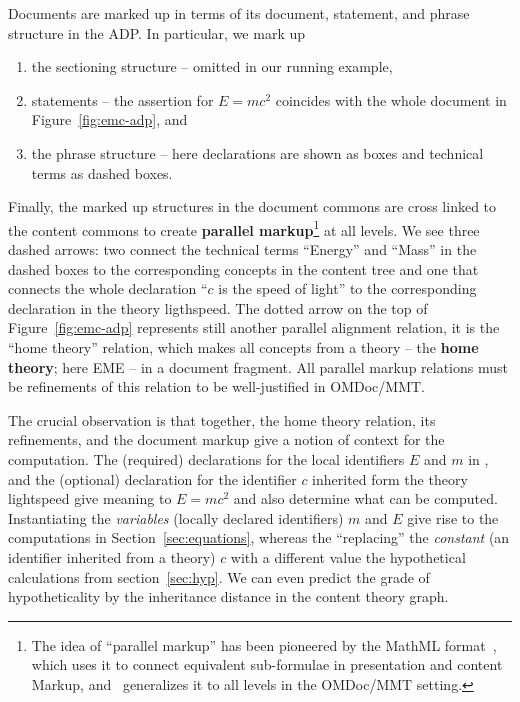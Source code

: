 Documents are marked up in terms of its document, statement, and phrase structure in the
ADP. In particular, we mark up
\begin{enumerate}
\item the sectioning structure -- omitted in our running example, 
\item statements -- the assertion for $E=mc^2$ coincides with the whole document
   in Figure~\ref{fig:emc-adp}, and
\item the phrase structure -- here declarations are shown as boxes and technical terms as
  dashed boxes.
\end{enumerate}
Finally, the marked up structures in the document commons are cross linked to the content
commons to create \textbf{parallel markup}\footnote{The idea of ``parallel markup'' has
  been pioneered by the MathML format~\cite{CarlisleEd:MathML3:base}, which uses it to
  connect equivalent sub-formulae in presentation and content Markup, and~\cite{Iancu:phd}
  generalizes it to all levels in the OMDoc/MMT setting.} at all levels. We see three
dashed arrows: two connect the technical terms ``Energy'' and ``Mass'' in the dashed boxes
to the corresponding concepts in the content tree and one that connects the whole
declaration ``$c$ is the speed of light'' to the corresponding declaration in the theory
\textsf{ligthspeed}. The dotted arrow on the top of Figure~\ref{fig:emc-adp} represents
still another parallel alignment relation, it is the ``home theory'' relation, which makes
all concepts from a theory -- the \textbf{home theory}; here \textsf{EME} -- in a document
fragment. All parallel markup relations must be refinements of this relation to be
well-justified in OMDoc/MMT.

The crucial observation is that together, the home theory relation, its refinements, and
the document markup give a notion of context for the computation. The (required)
declarations for the local identifiers $E$ and $m$ in , and the
(optional) declaration for the identifier $c$ inherited form the theory
\textsf{lightspeed} give meaning to $E=mc^2$ and also determine what can be
computed. Instantiating the \emph{variables} (locally declared identifiers) $m$ and $E$
give rise to the computations in Section~\ref{sec:equations}, whereas the ``replacing''
the \emph{constant} (an identifier inherited from a theory) $c$ with a different value the
hypothetical calculations from section~\ref{sec:hyp}. We can even predict the grade of
hypotheticality by the inheritance distance in the content theory graph.


